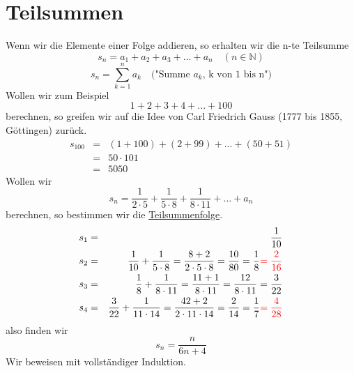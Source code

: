 \documentclass{report}
\begin{document}
\section{Teilsummen}
Wenn wir die Elemente einer Folge addieren, so erhalten wir die n-te Teilsumme
\begin{equation}s_n = a_1 + a_2 + a_3 + ... + a_n \quad (n \in \mathbb{N})\end{equation}
\begin{equation}s_n = \sum_{k=1}^{n} a_k \quad \mbox{("Summe $a_k$, k von 1 bis n")}\end{equation}
Wollen wir zum Beispiel
\begin{equation}1 + 2 + 3 + 4 + ... + 100\end{equation}
berechnen, so greifen wir auf die Idee von Carl Friedrich Gauss (1777 bis 1855, Göttingen) zurück.
\begin{eqnarray}s_{100} & = & (1 + 100) + (2 + 99) + ... + (50 + 51) \nonumber \\
& = & 50 \cdot 101 \nonumber \\
& = & 5050\end{eqnarray}
Wollen wir
\begin{equation}s_n = \frac{1}{2 \cdot 5} + \frac{1}{5 \cdot 8} + \frac{1}{8 \cdot 11} + ... + a_n\end{equation}
berechnen, so bestimmen wir die \underline{Teilsummenfolge}.
\begin{eqnarray}s_1 & = & \frac{1}{10}\\
s_2 & = & \frac{1}{10} + \frac{1}{5 \cdot 8} = \frac{8 + 2}{2 \cdot 5 \cdot 8} = \frac{10}{80} = \frac{1}{8} \textcolor{red}{ = \frac{2}{16}}\\
s_3 & = & \frac{1}{8} + \frac{1}{8 \cdot 11} = \frac{11 + 1}{8 \cdot 11} = \frac{12}{8 \cdot 11} = \frac{3}{22}\\
s_4 & = & \frac{3}{22} + \frac{1}{11 \cdot 14} = \frac{42 + 2}{2 \cdot 11 \cdot 14} = \frac{2}{14} = \frac{1}{7} \textcolor{red}{ = \frac{4}{28}}\end{eqnarray}
also finden wir
\begin{equation}s_n = \frac{n}{6n + 4}\end{equation}
Wir beweisen mit vollständiger Induktion.
\end{document}
